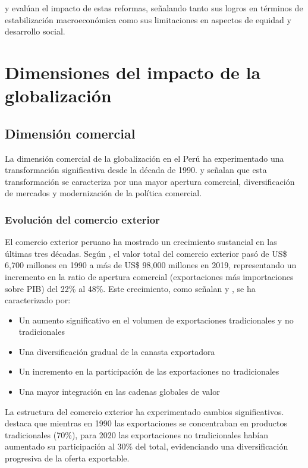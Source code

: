 \documentclass[12pt, a4paper]{article}
\begin{document}
\textcite{franco2018} y \textcite{vega2019} evalúan el impacto de estas reformas, señalando tanto sus logros en términos de estabilización macroeconómica como sus limitaciones en aspectos de equidad y desarrollo social.

\section{Dimensiones del impacto de la globalización}

\subsection{Dimensión comercial}

La dimensión comercial de la globalización en el Perú ha experimentado una transformación significativa desde la década de 1990. \textcite{santa_cruz2021} y \textcite{rodriguez2019} señalan que esta transformación se caracteriza por una mayor apertura comercial, diversificación de mercados y modernización de la política comercial.

\subsubsection{Evolución del comercio exterior}
El comercio exterior peruano ha mostrado un crecimiento sustancial en las últimas tres décadas. Según \textcite{tello2018}, el valor total del comercio exterior pasó de US\$ 6,700 millones en 1990 a más de US\$ 98,000 millones en 2019, representando un incremento en la ratio de apertura comercial (exportaciones más importaciones sobre PIB) del 22\% al 48\%. Este crecimiento, como señalan \textcite{mendoza2017} y \textcite{torres2020}, se ha caracterizado por:

\begin{itemize}
    \item Un aumento significativo en el volumen de exportaciones tradicionales y no tradicionales
    \item Una diversificación gradual de la canasta exportadora
    \item Un incremento en la participación de las exportaciones no tradicionales
    \item Una mayor integración en las cadenas globales de valor
\end{itemize}

La estructura del comercio exterior ha experimentado cambios significativos. \textcite{leon2019} destaca que mientras en 1990 las exportaciones se concentraban en productos tradicionales (70\%), para 2020 las exportaciones no tradicionales habían aumentado su participación al 30\% del total, evidenciando una diversificación progresiva de la oferta exportable.
\end{document}
